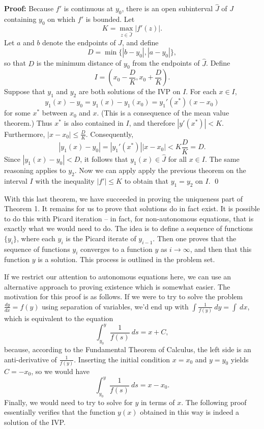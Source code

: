 \documentclass[12pt,letterpaper,twoside]{amsart}
\newcounter{problem}
\renewcommand{\proof}{{\bf Proof:}}
\begin{document}
\proof
Because $f'$ is continuous at $y_0$, there is an open subinterval $\hat{J}$ of $J$ containing $y_0$ on which $f'$ is bounded.  Let 
\[K=\max_{z \in \hat{J}} |f'(z)|.\]
Let $a$ and $b$ denote the endpoints of $\hat{J}$, and define
\[ D=\min \{ |b-y_0|,|a-y_0| \},\]
so that $D$ is the minimum distance of $y_0$ from the endpoints of $\hat{J}$.  Define
\[ I = \left( x_0-\frac{D}{K}, x_0+\frac{D}{K} \right) .\]
Suppose that $y_1$ and $y_2$ are both solutions of the IVP on $I$.  For each $x \in I$,
\[ y_1(x)-y_0 = y_1(x)-y_1(x_0)=y_1'(x^*)(x-x_0)\]
for some $x^*$ between $x_0$ and $x$.  (This is a consequence of the mean value theorem.)  Thus $x^*$ is also contained in $I$, and therefore $|y'(x^*)|<K$.  Furthermore, $|x-x_0| \leq \frac{D}{K}$.  Consequently,
\[ |y_1(x)-y_0| = |y_1'(x^*)||x-x_0| < K \frac{D}{K}=D.\]
Since $|y_1(x)-y_0| < D$, it follows that $y_1(x) \in \hat{J}$ for all $x \in I$.  The same reasoning applies to $y_2$.  Now we can apply apply the previous theorem on the interval $I$ with the inequality $|f'|\leq K$ to obtain that $y_1=y_2$ on $I$.
\qed


With this last theorem, we have succeeded in proving the uniqueness part of Theorem 1.  It remains for us to prove that solutions do in fact exist.  It is possible to do this with Picard iteration -- in fact, for non-autonomous equations, that is exactly what we would need to do.  The idea is to define a sequence of functions $\{ y_i \}$, where each $y_i$ is the Picard iterate of $y_{i-1}$.  Then one proves that the sequence of functions $y_i$ converges to a function $y$ as $i \rightarrow \infty$, and then that this function $y$ is a solution.  This process is outlined in the problem set.

If we restrict our attention to autonomous equations here, we can use an alternative approach to proving existence which is somewhat easier.  The motivation for this proof is as follows.  If we were to try to solve the problem $\frac{dy}{dx}=f(y)$ using separation of variables, we'd end up with $\int \frac{1}{f(y)}\ dy = \int \ dx$, which is equivalent to the equation
\[ \int_{y_0}^y \frac{1}{f(s)} \ ds = x+C,\]
because, according to the Fundamental Theorem of Calculus, the left side is an anti-derivative of $\frac{1}{f(y)}$. 
Inserting the initial condition $x=x_0$ and $y=y_0$ yields $C=-x_0$, so we would have
\[ \int_{y_0}^y \frac{1}{f(s)} \ ds = x-x_0.\]
Finally, we would need to try to solve for $y$ in terms of $x$.  The following proof essentially verifies that the function $y(x)$ obtained in this way is indeed a solution of the IVP.
\end{document}
